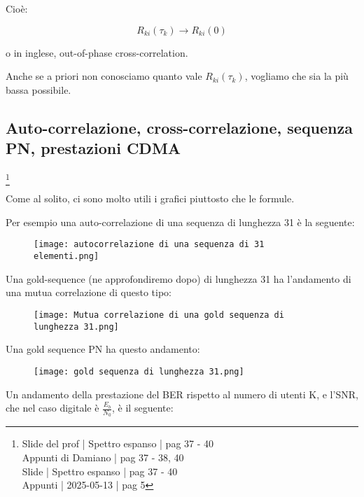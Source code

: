 Cioè: 

{
    \Large 
    \begin{equation}
        R_{ki} (\tau_k) \to R_{ki} (0)
    \end{equation}
}

o in inglese, out-of-phase cross-correlation. \newline 

Anche se a priori non conosciamo quanto vale $R_{ki} (\tau_k)$, 
vogliamo che sia la più bassa possibile. \newline 

\newpage 

\subsection{Auto-correlazione, cross-correlazione, sequenza PN, prestazioni CDMA}
\footnote{Slide del prof | Spettro espanso | pag 37 - 40 \\
Appunti di Damiano | pag 37 - 38, 40 \\
Slide | Spettro espanso | pag 37 - 40 \\
Appunti | 2025-05-13 | pag 5 
} 

Come al solito, 
ci sono molto utili i grafici piuttosto che le formule. \newline 

Per esempio una auto-correlazione di una sequenza di lunghezza 31 è la seguente: 

\begin{figure}[h]
    \centering
    \texttt{[image: autocorrelazione di una sequenza di 31 elementi.png]}
\end{figure}

Una gold-sequence (ne approfondiremo dopo) di lunghezza 31 ha l'andamento di una mutua correlazione di questo tipo: 

\begin{figure}[h]
    \centering
    \texttt{[image: Mutua correlazione di una gold sequenza di lunghezza 31.png]}
\end{figure}

Una gold sequence PN ha questo andamento: 

\begin{figure}[h]
    \centering
    \texttt{[image: gold sequenza di lunghezza 31.png]}
\end{figure}

\newpage 

Un andamento della prestazione del BER rispetto al numero di utenti K, 
e l'SNR, che nel caso digitale è $\frac{E_b}{N_0}$, è il seguente: 

